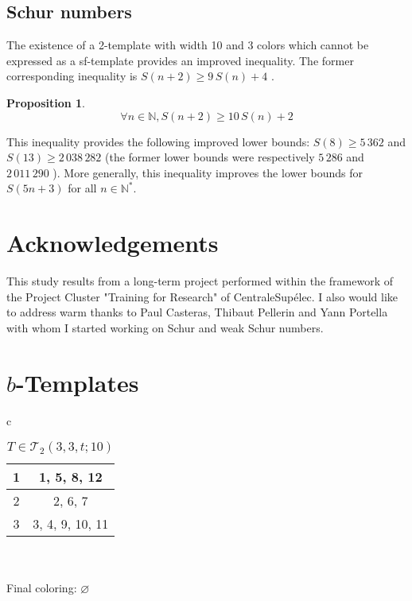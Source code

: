 \documentclass{article}
\newtheorem{proposition}[definition]{Proposition}
\begin{document}
\subsection{Schur numbers}

The existence of a 2-template with width 10 and 3 colors which cannot be expressed as a sf-template provides an improved 
inequality. The former corresponding inequality is \(S(n + 2) \geqslant 9 \, S(n) + 4\) \cite{AbbottHanson}.

\begin{proposition}
	\[\forall n \in \mathbb{N}, S(n + 2) \geqslant 10 \, S(n) + 2\]
\end{proposition}

This inequality provides the following improved lower bounds: \(S(8) \geqslant 5\,362\) and 
\(S(13) \geqslant 2\,038\,282\) (the former lower bounds were respectively \(5\,286\) \cite{RowleyRamsey} and 
\(2\,011\,290\) \cite{schurboyz}). More generally, this inequality improves the lower bounds for \(S(5 n + 3)\) for all 
\(n \in \mathbb{N}^*\).

\section{Acknowledgements}

This study results from a long-term project performed within the framework of the Project Cluster "Training for 
Research" of CentraleSupélec. I also would like to address warm thanks to Paul Casteras, Thibaut Pellerin and Yann 
Portella with whom I started working on Schur and weak Schur numbers.




\appendix

\section{\(b\)-Templates}
\label{appendix}

\begin{table}[H]
\caption{\(T \in \mathcal{T}_2(3, 3, t; 10)\)}
\begin{center}
\begin{tabular}{c}
	\begin{tabular}{| c | c |}
		\hline
		1 & 1, 5, 8, 12 \\
		\hline
		2 & 2, 6, 7 \\
		\hline
		3 & 3, 4, 9, 10, 11 \\
		\hline
	\end{tabular} \\ \\
	 Final coloring: \(\varnothing\)
\end{tabular}
\end{center}
\end{table}
\end{document}

